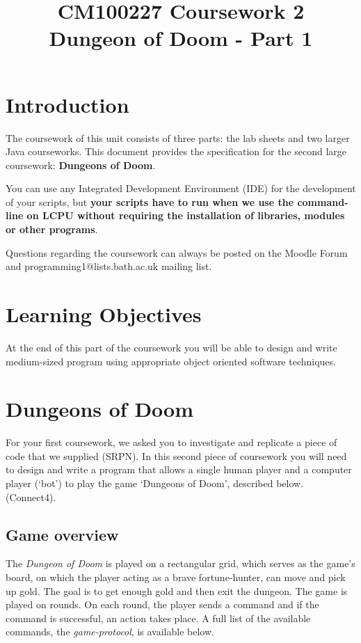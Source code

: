 \documentclass{article}
\title{CM100227 Coursework 2\\ Dungeon of Doom - Part 1}
\begin{document}
\maketitle

\section{Introduction}
The coursework of this unit consists of three parts: the lab sheets and two larger Java courseworks. This document provides the specification for the second large coursework: \textbf{Dungeons of Doom}.

You can use any Integrated Development Environment (IDE) for the development of your scripts, but \textbf{your scripts have to run when we use the command-line on LCPU  without requiring the installation of libraries, modules or other programs}.

Questions regarding the coursework can always be posted on the Moodle Forum and programming1@lists.bath.ac.uk mailing list.

\section{Learning Objectives}
At the end of this part of the coursework you will be able to design and write medium-sized program using  appropriate object oriented software techniques.

\section{Dungeons of Doom}
For your first coursework, we asked you to investigate and replicate a piece of code that we 
supplied (SRPN). In this second piece of coursework you will need to design and write a program that allows a single human player and a computer player (`bot') to play the game `Dungeons of Doom', described below. (Connect4).

\subsection{Game overview}

The \textit{Dungeon of Doom} is played on a rectangular grid, which serves as the game's board, on which the player acting as a brave fortune-hunter, can move and pick up gold. The goal is to get enough gold and then exit the dungeon. The game is played on rounds. On each round, the player sends a command and if the command is successful, an action takes place. A full list of the available commands, the \textit{game-protocol}, is available below.
\end{document}
